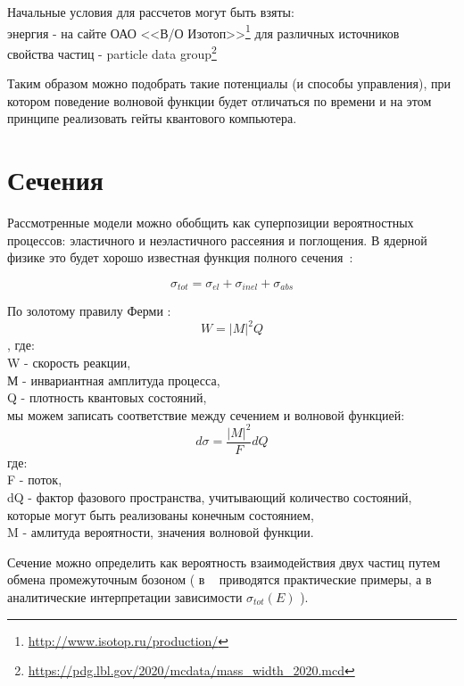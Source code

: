 \documentclass[11pt]{article}
\begin{document}
Начальные условия для рассчетов могут быть взяты: \\
энергия -  на сайте ОАО <<В/О Изотоп>>\footnote{\url{http://www.isotop.ru/production/}} для различных  источников \\
свойства частиц - particle data group\footnote{\url{https://pdg.lbl.gov/2020/mcdata/mass_width_2020.mcd}}

Таким образом можно подобрать такие потенциалы (и способы управления), при котором поведение волновой функции будет отличаться по времени и на этом принципе реализовать гейты квантового компьютера.

\section{Сечения}
Рассмотренные модели можно обобщить как суперпозиции вероятностных процессов: эластичного и неэластичного рассеяния и поглощения. В ядерной физике это будет хорошо известная функция полного сечения~\cite{Giancoli}: 

\begin{equation}
\sigma_{tot} = \sigma_{el}+\sigma_{inel}+\sigma_{abs}
\end{equation}

По золотому правилу Ферми \cite{Courcera_NPh, Mart} : 
\begin{equation}
W=|M|^2Q
\end{equation}
, где: \\
W - скорость реакции, \\
М - инвариантная амплитуда процесса, \\
Q - плотность квантовых состояний, \\

мы можем записать соответствие между сечением и волновой функцией:
\begin{equation}
d\sigma = \frac{|M|^2}{F}dQ
\end{equation}
где: \\
F - поток, \\
dQ - фактор фазового пространства, учитывающий количество состояний, которые могут быть реализованы конечным состоянием,\\
M - амлитуда вероятности, значения волновой функции. 

Сечение можно определить как вероятность взаимодействия двух частиц путем обмена промежуточным бозоном ( в ~\cite{Martin} приводятся практические примеры, а в ~\cite{Sarycheva} аналитические интерпретации зависимости $\sigma_{tot}(E)$ ).
\end{document}
